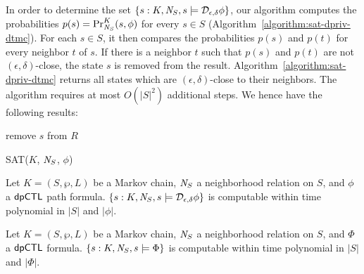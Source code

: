 In order to determine the set $\{ s : K, \neighbor{S}, s \models
\dpriv{\epsilon}{\delta} \phi \}$, our algorithm computes
the probabilities $p (s) = \myPr{s}{K}{\neighbor{S}}{\phi}$ for every
$s \in S$ (Algorithm~\ref{algorithm:sat-dpriv-dtmc}). For each $s \in S$,
it then compares the probabilities $p (s)$ and $p (t)$ for every
neighbor $t$ of $s$. If there is a neighbor $t$ such that $p (s)$ and
$p (t)$ are not $(\epsilon, \delta)$-close, the state $s$
is removed from the result. 
Algorithm~\ref{algorithm:sat-dpriv-dtmc} returns all states which are
$(\epsilon, \delta)$-close to their neighbors.
The algorithm requires at most $O
(|S|^2)$ additional steps.
We hence have the following results:

\begin{algorithm}[tbh]
  \begin{algorithmic}[1]
    \Match{$\phi$}
    \Case{$\X \Psi$}
    \EndCase
    \EndCase
    \EndMatch
        {remove $s$ from $R$}
        \EndIf
      \EndFor
    \EndFor

    \EndProcedure
  \end{algorithmic}
  \caption{SAT($K$, $\neighbor{S}$, $\phi$)}
  \label{algorithm:sat-dpriv-dtmc}
\end{algorithm}

\begin{proposition}
  Let $K = (S, \wp, L)$ be a Markov chain, $\neighbor{S}$ a
  neighborhood relation on $S$, and $\phi$ a $\dpCTL$ path formula.
  $\{ s : K, \neighbor{S}, s \models \dpriv{\epsilon}{\delta} \phi \}$ is
  computable within time polynomial in $|S|$ and $|\phi|$.
\end{proposition}

\begin{corollary}
  Let $K = (S, \wp, L)$ be a Markov chain, $\neighbor{S}$ a
  neighborhood relation on $S$, and $\Phi$ a $\dpCTL$
  formula. $\{ s : K, \neighbor{S}, s \models \Phi \}$ is
  computable within time polynomial in $|S|$ and $|\Phi|$.
\end{corollary}

